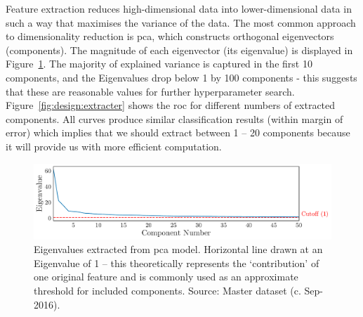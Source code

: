 \documentclass[../thesis/thesis.tex]{subfiles}
\begin{document}
Feature extraction reduces high-dimensional data into lower-dimensional data in such a way that maximises the variance of the data. The most common approach to dimensionality reduction is \gls{pca}, which constructs orthogonal eigenvectors (components). The magnitude of each eigenvector (its eigenvalue) is displayed in Figure~\ref{fig:design:scree_plot}. The majority of explained variance is captured in the first 10 components, and the Eigenvalues drop below 1 by 100 components - this suggests that these are reasonable values for further hyperparameter search. Figure~\ref{fig:design:extracter} shows the \gls{roc} for different numbers of extracted components. All curves produce similar classification results (within margin of error) which implies that we should extract between 1 -- 20 components because it will provide us with more efficient computation.

\begin{figure}[!htb]
    \centering
    \includegraphics[width=\textwidth]{../figures/design/scree_plot}
    \caption[PCA Scree Plot]{Eigenvalues extracted from \gls{pca} model. Horizontal line drawn at an Eigenvalue of 1 -- this theoretically represents the ‘contribution’ of one original feature and is commonly used as an approximate threshold for included components. Source: Master dataset (c. Sep-2016).}
    \label{fig:design:scree_plot}
\end{figure}
\end{document}
